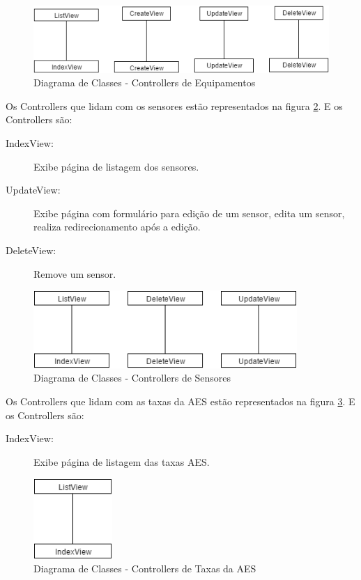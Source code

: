\begin{figure}
\centering
\includegraphics[width=14cm,keepaspectratio]{figuras/diagrama_cont_equipment.png}
\caption{\label{fig:diagrama-cont-equipment} Diagrama de Classes - Controllers de Equipamentos}
\end{figure}

Os Controllers que lidam com os sensores estão representados na figura \ref{fig:diagrama-cont-sensor}. E os Controllers são:
\begin{description}
	\item[IndexView:] Exibe página de listagem dos sensores.
	\item[UpdateView:] Exibe página com formulário para edição de um sensor, edita um sensor, realiza redirecionamento após a edição.
	\item[DeleteView:] Remove um sensor.
\end{description} 

\begin{figure}
\centering
\includegraphics[width=10cm,keepaspectratio]{figuras/diagrama_cont_sensor.png}
\caption{\label{fig:diagrama-cont-sensor} Diagrama de Classes - Controllers de Sensores}
\end{figure}

Os Controllers que lidam com as taxas da AES estão representados na figura \ref{fig:diagrama-cont-aesrate}. E os Controllers são:
\begin{description}
	\item[IndexView:] Exibe página de listagem das taxas AES.
\end{description} 

\begin{figure}
\centering
\includegraphics[width=3cm,keepaspectratio]{figuras/diagrama_cont_aesrate.png}
\caption{\label{fig:diagrama-cont-aesrate} Diagrama de Classes - Controllers de Taxas da AES}
\end{figure}

